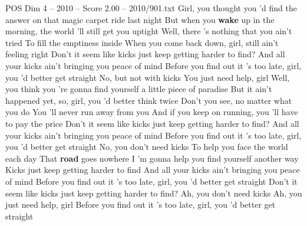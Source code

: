 \begin{textsample}{POS Dim 4 – 2010 – Score 2.00 – 2010/901.txt}  \label{ex:f4_pos_034}
Girl, you thought you 'd find the answer on that magic carpet ride last night But when you \textbf{wake} up in the morning, the world 'll still get you uptight Well, there 's nothing that you ain't tried To fill the emptiness inside When you come back down, girl, still ain't feeling right Don't it seem like kicks just keep getting harder to find?
And all your kicks ain't bringing you peace of mind Before you find out it 's too late, girl, you 'd better get straight No, but not with kicks You just need help, girl Well, you think you 're gonna find yourself a little piece of paradise But it ain't happened yet, so, girl, you 'd better think twice Don't you see, no matter what you do You 'll never run away from you And if you keep on running, you 'll have to pay the price Don't it seem like kicks just keep getting harder to find?
And all your kicks ain't bringing you peace of mind Before you find out it 's too late, girl, you 'd better get straight No, you don't need kicks To help you face the world each day That \textbf{road} goes nowhere I 'm gonna help you find yourself another way Kicks just keep getting harder to find And all your kicks ain't bringing you peace of mind Before you find out it 's too late, girl, you 'd better get straight Don't it seem like kicks just keep getting harder to find?
Ah, you don't need kicks Ah, you just need help, girl Before you find out it 's too late, girl, you 'd better get straight

\end{textsample}
